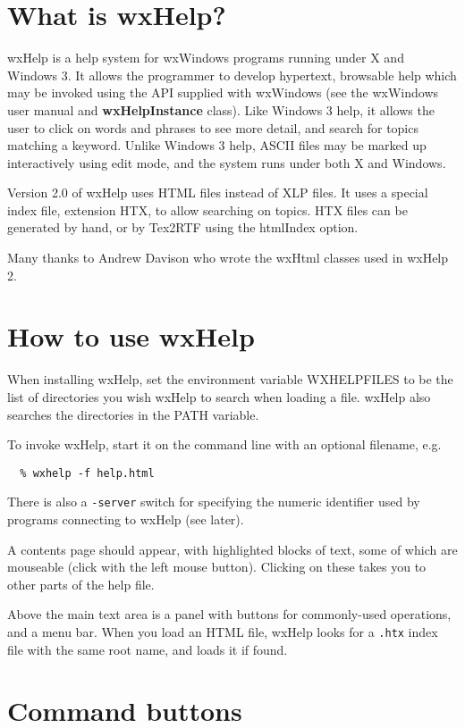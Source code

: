 \section{What is wxHelp?}

wxHelp is a help system for wxWindows programs running under X and Windows 3.
It allows the programmer to develop hypertext, browsable help which may be
invoked using the API supplied with wxWindows (see the wxWindows user manual
and {\bf wxHelpInstance} class).  Like Windows 3 help, it allows the user to
click on words and phrases to see more detail, and search for topics matching
a keyword. Unlike Windows 3 help, ASCII files may be marked up interactively
using edit mode, and the system runs under both X and Windows.

Version 2.0 of wxHelp uses HTML files instead of XLP files. It uses a special
index file, extension HTX, to allow searching on topics. HTX files can be generated
by hand, or by Tex2RTF using the htmlIndex option.

Many thanks to Andrew Davison who wrote the wxHtml classes used in wxHelp 2.

\section{How to use wxHelp}

When installing wxHelp, set the environment variable WXHELPFILES to
be the list of directories you wish wxHelp to search when loading a
file. wxHelp also searches the directories in the PATH variable.

To invoke wxHelp, start it on the command line with an optional
filename, e.g.

\begin{verbatim}
  % wxhelp -f help.html
\end{verbatim}

There is also a {\tt -server} switch for specifying the numeric identifier
used by programs connecting to wxHelp (see later).

A contents page should appear, with highlighted blocks of text, some
of which are mouseable (click with the left mouse button).  Clicking
on these takes you to other parts of the help file.

Above the main text area is a panel with buttons for commonly-used
operations, and a menu bar. When you load an HTML file, wxHelp looks for
a {\tt .htx} index file with the same root name, and loads it if found.

\section{Command buttons}

